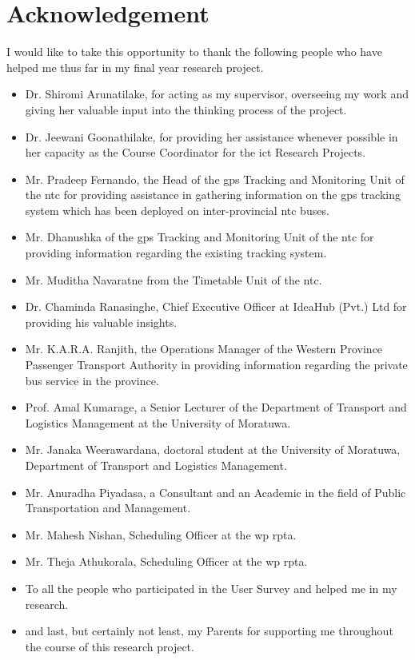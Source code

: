 
\clearpage
\section*{Acknowledgement}
I would like to take this opportunity to thank the following people who have helped me thus far in my final year research project.
\begin{itemize}
\item Dr. Shiromi Arunatilake, for acting as my supervisor, overseeing my work and giving her valuable input into the thinking process of the project.
\item Dr. Jeewani Goonathilake, for providing her assistance whenever possible in her capacity as the Course Coordinator for the \acrshort{ict} Research Projects.
\item Mr. Pradeep Fernando, the Head of the \acrshort{gps} Tracking and Monitoring Unit of the \acrshort{ntc} for providing assistance in gathering information on the \acrshort{gps} tracking system which has been deployed on inter-provincial \acrshort{ntc} buses.
\item Mr. Dhanushka of the \acrshort{gps} Tracking and Monitoring Unit of the \acrshort{ntc} for providing information regarding the existing tracking system.
\item Mr. Muditha Navaratne from the Timetable Unit of the \acrshort{ntc}.
\item Dr. Chaminda Ranasinghe, Chief Executive Officer at IdeaHub (Pvt.) Ltd for providing his valuable insights.
\item Mr. K.A.R.A. Ranjith, the Operations Manager of the Western Province Passenger Transport Authority in providing information regarding the private bus service in the province.
\item Prof. Amal Kumarage, a Senior Lecturer of the Department of Transport and Logistics Management at the University of Moratuwa.
\item Mr. Janaka Weerawardana, doctoral student at the University of Moratuwa, Department of Transport and Logistics Management.
\item Mr. Anuradha Piyadasa, a Consultant and an Academic in the field of Public Transportation and Management.
\item Mr. Mahesh Nishan, Scheduling Officer at the \acrshort{wp} \acrshort{rpta}.
\item Mr. Theja Athukorala, Scheduling Officer at the \acrshort{wp} \acrshort{rpta}.
\item To all the people who participated in the User Survey and helped me in my research.
\item and last, but certainly not least, my Parents for supporting me throughout the course of this research project.
\end{itemize}